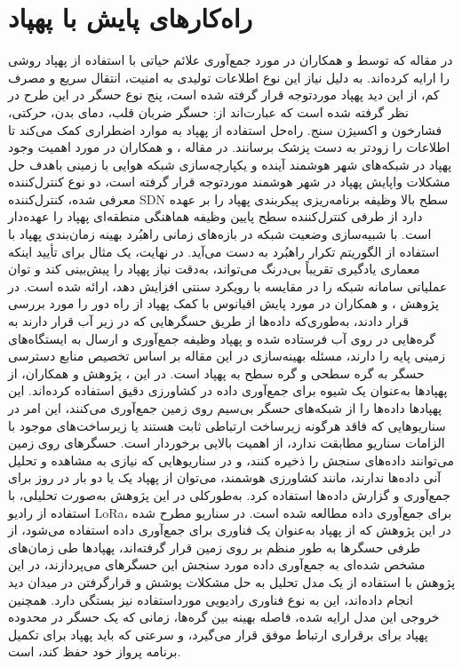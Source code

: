 \section{راه‌کار‌های پایش با پهپاد}
در مقاله \cite{Ananthi2021} که توسط  و همکاران در مورد جمع‌آوری علائم حیاتی با استفاده از پهپاد روشی را ارایه کرده‌اند. به دلیل نیاز این نوع اطلاعات تولیدی به امنیت، انتقال سریع و مصرف کم، از این دید پهپاد موردتوجه قرار گرفته شده است، پنج نوع حسگر در این طرح در نظر گرفته شده است که عبارت‌اند از: حسگر ضربان قلب، دمای بدن، حرکتی، فشارخون و اکسیژن سنج. راه‌حل استفاده از پهپاد به موارد اضطراری کمک می‌کند تا اطلاعات را زودتر به دست پزشک برسانند.
در مقاله \cite{Tan2021}،  و همکاران در مورد اهمیت وجود پهپاد در شبکه‌های شهر هوشمند آینده و یکپارچه‌سازی شبکه هوایی با زمینی باهدف حل مشکلات واپایش پهپاد در شهر هوشمند موردتوجه قرار گرفته است، دو نوع کنترل‌کننده معرفی شده، کنترل‌کننده \gls{SDN} سطح بالا وظیفه برنامه‌ریزی پیکربندی پهپاد را بر عهده دارد از طرفی کنترل‌کننده  سطح پایین وظیفه هماهنگی منطقه‌ای پهپاد را عهده‌دار است. با شبیه‌سازی وضعیت شبکه در بازه‌های زمانی راهبُرد بهینه زمان‌بندی پهپاد با استفاده از الگوریتم تکرار راهبُرد به دست می‌آید. در نهایت، یک مثال برای تأیید اینکه معماری یادگیری تقریباً بی‌درنگ می‌تواند، به‌دقت نیاز پهپاد را پیش‌بینی کند و توان عملیاتی سامانه شبکه را در مقایسه با رویکرد سنتی افزایش دهد، ارائه شده است.
در پژوهش \cite{Ma2021}،  و همکاران در مورد پایش اقیانوس با کمک پهپاد از راه دور را مورد بررسی قرار دادند، به‌طوری‌که داده‌ها از طریق حسگرهایی که در زیر آب قرار دارند به گره‌هایی در روی آب فرستاده شده و پهپاد وظیفه جمع‌آوری و ارسال به ایستگاه‌های زمینی پایه را دارند، مسئله بهینه‌سازی در این مقاله بر اساس تخصیص منابع دسترسی حسگر به گره سطحی و گره سطح به پهپاد است.
در این \cite{Caruso2021}، پژوهش  و همکاران، از پهپادها به‌عنوان یک شیوه برای جمع‌آوری داده در کشاورزی دقیق استفاده کرده‌اند. این پهپادها داده‌ها را از شبکه‌های حسگر بی‌سیم روی زمین جمع‌آوری می‌کنند، این امر در سناریوهایی که فاقد هرگونه زیرساخت ارتباطی ثابت هستند یا زیرساخت‌های موجود با الزامات سناریو مطابقت ندارد، از اهمیت بالایی برخوردار است. حسگرهای روی زمین می‌توانند داده‌های سنجش را ذخیره کنند، و در سناریوهایی که نیازی به مشاهده و تحلیل آنی داده‌ها ندارند، مانند کشاورزی هوشمند، می‌توان از پهپاد یک یا دو بار در روز برای جمع‌آوری و گزارش داده‌ها استفاده کرد. به‌طورکلی در این پژوهش به‌صورت تحلیلی، با استفاده از رادیو \gls{LoRa}، برای جمع‌آوری داده مطالعه شده است.
در سناریو مطرح شده در این پژوهش که از پهپاد به‌عنوان یک فناوری برای جمع‌آوری داده استفاده می‌شود، از طرفی حسگرها به طور منظم بر روی زمین قرار گرفته‌اند، پهپادها طی زمان‌های مشخص شده‌ای به جمع‌آوری داده مورد سنجش این حسگرهای می‌پردازند، در این پژوهش با استفاده از یک مدل تحلیل به حل مشکلات پوشش و قرارگرفتن در میدان دید انجام داده‌اند، این به نوع فناوری رادیویی مورداستفاده نیز بستگی دارد. همچنین خروجی این مدل ارایه شده، فاصله بهینه بین گره‌ها، زمانی که یک حسگر در محدوده پهپاد برای برقراری ارتباط موفق قرار می‌گیرد، و سرعتی که باید پهپاد برای تکمیل برنامه پرواز خود حفظ کند، است.
